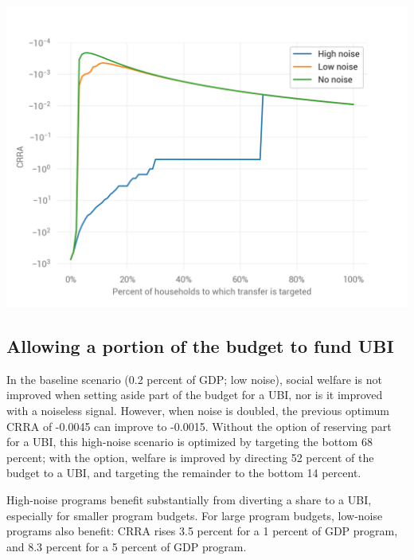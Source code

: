 \documentclass[12pt]{article}
\begin{document}
\begin{center}
	\includegraphics{by_noise_0_2_0}  %
	\label{fig:by_noise_0_2_0}
\end{center}

\subsection{Allowing a portion of the budget to fund UBI} \label{ubi_portion}

In the baseline scenario (0.2 percent of GDP; low noise), social welfare is not 
improved when setting aside part of the budget for a UBI, nor is it improved 
with a noiseless signal. However, when noise is doubled, the previous optimum 
CRRA of -0.0045 can improve to -0.0015. Without the option of reserving part 
for a UBI, this high-noise scenario is optimized by targeting the bottom 68 
percent; with the option, welfare is improved by directing 52 percent of the 
budget to a UBI, and targeting the remainder to the bottom 14 percent.

High-noise programs benefit substantially from diverting a share to a UBI, 
especially for smaller program budgets. For large program budgets, low-noise 
programs also benefit: CRRA rises 3.5 percent for a 1 percent of GDP program, 
and 8.3 percent for a 5 percent of GDP program.
\end{document}
